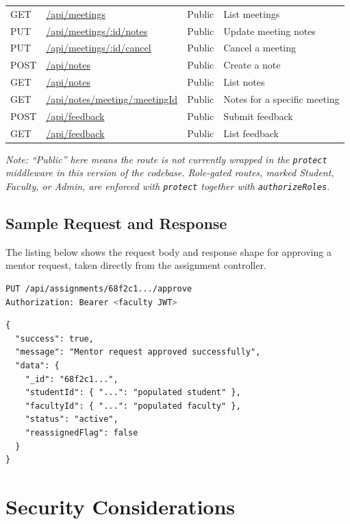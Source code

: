 \documentclass[12pt,a4paper]{report}
\newcommand{\sectionrule}{\vspace{-4pt}{\color{lightgray}\hrule height 1pt}\vspace{8pt}}
\begin{document}
\begin{longtable}{@{}p{1.3cm}p{5.2cm}p{2.1cm}p{4.3cm}@{}}
GET & \url{/api/meetings} & Public & List meetings \\
PUT & \url{/api/meetings/:id/notes} & Public & Update meeting notes \\
PUT & \url{/api/meetings/:id/cancel} & Public & Cancel a meeting \\
POST & \url{/api/notes} & Public & Create a note \\
GET & \url{/api/notes} & Public & List notes \\
GET & \url{/api/notes/meeting/:meetingId} & Public & Notes for a specific meeting \\
POST & \url{/api/feedback} & Public & Submit feedback \\
GET & \url{/api/feedback} & Public & List feedback \\
\bottomrule
\end{longtable}

\textit{Note: ``Public'' here means the route is not currently wrapped in the \texttt{protect} middleware in this version of the codebase. Role-gated routes, marked Student, Faculty, or Admin, are enforced with \texttt{protect} together with \texttt{authorizeRoles}.}

\section{Sample Request and Response}
\sectionrule
The listing below shows the request body and response shape for approving a mentor request, taken directly from the assignment controller.

\begin{lstlisting}[language=bash, caption={Request}]
PUT /api/assignments/68f2c1.../approve
Authorization: Bearer <faculty JWT>
\end{lstlisting}

\begin{lstlisting}[caption={Response}]
{
  "success": true,
  "message": "Mentor request approved successfully",
  "data": {
    "_id": "68f2c1...",
    "studentId": { "...": "populated student" },
    "facultyId": { "...": "populated faculty" },
    "status": "active",
    "reassignedFlag": false
  }
}
\end{lstlisting}

\chapter{Security Considerations}
\end{document}
